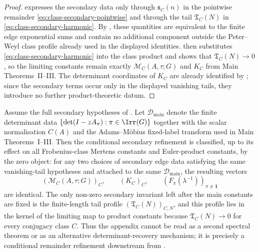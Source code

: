\begin{proof}

   expresses the secondary data only
  through \(\mathfrak s_C(n)\) in the pointwise remainder
  \eqref{eq:class-secondary-pointwise} and through the tail
  \(\mathfrak T_C(N)\) in \eqref{eq:class-secondary-harmonic}.  By
  , these quantities are equivalent to
  the finite edge exponential sums and contain no additional component
  outside the Peter--Weyl class profile already used in the displayed
  identities.   then substitutes
  \eqref{eq:class-secondary-harmonic} into the class product and shows that
  \(\mathfrak T_C(N)\to0\), so the limiting constants remain exactly
  \(\mathcal M_C(A,\tau;G)\) and \(K_C\) from Main Theorems~II--III.  The
  determinant coordinates of \(K_C\) are already identified by
  ; since the secondary terms
  occur only in the displayed vanishing tails, they introduce no further
  product-theoretic datum.
\end{proof}


\begin{proposition}
  \label{prop:secondary-package-supporting-classification}
  Assume the full secondary hypotheses of
  .  Let
  \(\mathcal D_{\mathrm{main}}\) denote the finite determinant data
  \(\{\det(I-zA_\pi):\pi\in\Irr(G)\}\) together with the scalar normalisation
  \(C(A)\) and the Adams--M\"obius fixed-label transform used in Main
  Theorems~I--III.  Then the conditional secondary refinement is classified, up to
  its effect on all Frobenius-class Mertens constants and Euler-product
  constants, by the zero object: for any two choices of secondary edge data
  satisfying the same vanishing-tail hypotheses and attached to the same
  \(\mathcal D_{\mathrm{main}}\), the resulting vectors
  \[
    (\mathcal M_C(A,\tau;G))_{C},\qquad
    (K_C)_{C},
    \qquad
    (F_\pi(\lambda^{-1}))_{\pi\ne\mathbf1}
  \]
  are identical.  The only non-zero secondary invariant left after the main
  constants are fixed is the finite-length tail profile
  \((\mathfrak T_C(N))_{C,N}\), and this profile lies in the kernel of the
  limiting map to product constants because \(\mathfrak T_C(N)\to0\) for
  every conjugacy class \(C\).  Thus the appendix cannot be read as a second
  spectral theorem or as an alternative determinant-recovery mechanism; it is
  precisely a conditional remainder refinement downstream from
  .
\end{proposition}

